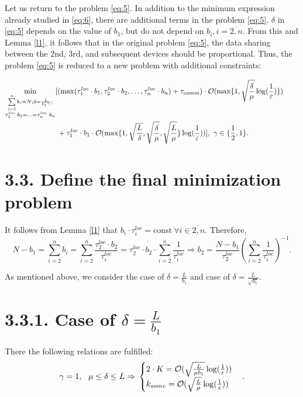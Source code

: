 \documentclass{article}
\theoremstyle{definition}
\theoremstyle{plain}
\begin{document}
Let us return to the problem \eqref{eq:5}. In addition to the minimum expression already studied in \eqref{eq:6}, there are additional terms in the problem \eqref{eq:5}.  $\delta$ in \eqref{eq:5} depends on the value of $b_1$, but do not depend on $b_i, i = \overline{2, n}$. From this and Lemma \ref{l1}, it follows that in the original problem \eqref{eq:5}, the data sharing between the 2nd, 3rd, and subsequent devices should be proportional. Thus, the problem \eqref{eq:5} is reduced to a new problem with additional constraints:

\begin{eqnarray}
    \begin{split}
    \label{eq:7}
        \min_{\substack{\sum\limits_{i = 1}^{n} b_i = N; \delta = \frac{L}{{b_1}^\gamma};  \\
        \tau_2^{loc}\cdot b_2 = \ldots = \tau_n^{loc}\cdot b_n }} 
        [&(\max(\tau_1^{loc}\cdot b_1, \tau_2^{loc}\cdot b_2, \ldots , \tau_n^{loc}\cdot b_n) + \tau_{comm})\cdot \mathcal O(\max\{1, \sqrt{\frac{\delta}{\mu}}\log(\frac{1}{\varepsilon})\})
        \\ &+
        \tau_1^{loc}\cdot b_1\cdot\mathcal O(\max\{1,\sqrt{\frac{L}{\delta}}, \sqrt{\frac{\delta}{\mu}}, \sqrt{\frac{L}{\mu}}\}\log(\frac{1}{\varepsilon}))] ,  ~ \gamma \in \{\frac{1}{2}, 1\}. \hspace{2.4cm}
    \end{split}
\end{eqnarray}
    

\section*{3.3. Define the final minimization problem}
It follows from Lemma \ref{l1} that $b_i\cdot \tau_i^{loc} = \text{const} ~ \forall i \in \overline{2, n}$.
Therefore, $$ N - b_1 = \sum\limits_{i = 2}^{n} b_i = \sum\limits_{i = 2}^{n} \frac{\tau_2^{loc}\cdot b_2}{\tau_i^{loc}} = \tau_2^{loc}\cdot b_2 \cdot \sum\limits_{i = 2}^{n} \frac{1}{\tau_i^{loc}} \Rightarrow
b_2 = \frac{N - b_1}{\tau_2 ^{loc}}(\sum\limits_{i = 2}^{n} \frac{1}{\tau_i^{loc}})^{-1}.$$

As mentioned above, we consider the case of $\delta = \frac{L}{b_1}$ and case of $\delta = \frac{L}{\sqrt{b_1}}$.
\section*{3.3.1. Case of $\delta = \frac{L}{b_1}$}

There the following relations are fulfilled:
\begin{equation}
    \notag
    \gamma = 1,~~ \mu \leq \delta \leq L \Rightarrow 
    \\
    \notag
    \begin{cases}
      2\cdot K =  \mathcal O(\sqrt{\frac{L}{\mu b_1}}\log(\frac{1}{\varepsilon}))\\
      k_{some} = \mathcal O(\sqrt{\frac{L}{\mu}}\log(\frac{1}{\varepsilon}))
    \end{cases}.
\end{equation}
\end{document}
